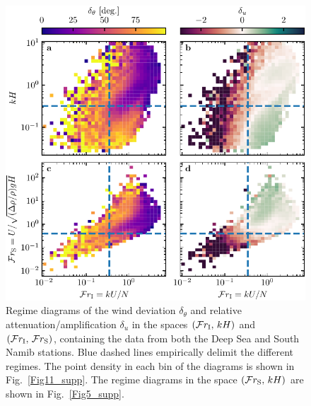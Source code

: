 \begin{figure}
  \centering
  \includegraphics[scale=1]{Figures/Figure12_supp.pdf}
  \caption{Regime diagrams of the wind deviation $\delta_{\theta}$ and relative attenuation/amplification $\delta_{u}$ in the spaces $(\mathcal{F}r_{\textup{I}}, \, kH)$ and $(\mathcal{F}r_{\textup{I}}, \, \mathcal{F}r_{\textup{S}})$, containing the data from both the Deep Sea and South Namib stations. Blue dashed lines empirically delimit the different regimes. The point density in each bin of the diagrams is shown in Fig.~\ref{Fig11_supp}. The regime diagrams in the space $(\mathcal{F}r_{\textup{S}}, \, kH)$ are shown in Fig.~\ref{Fig5_supp}.}
  \label{Fig12_supp}
\end{figure}

